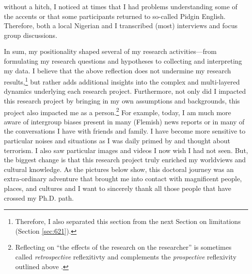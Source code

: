without a hitch, I noticed at times that I had problems understanding some of the accents or that some participants returned to so-called Pidgin English. Therefore, both a local Nigerian and I transcribed (most) interviews and focus group discussions.


In sum, my positionality shaped several of my research activities---from formulating my research questions and hypotheses to collecting and interpreting my data. I believe that the above reflection does not undermine my research results,\footnote{Therefore, I also separated this section from the next Section on limitations (Section \ref{sec:621}).} but rather adds additional insights into the complex and multi-layered dynamics underlying each research project. Furthermore, not only did I impacted this research project by bringing in my own assumptions and backgrounds, this project also impacted me as a person.\footnote{Reflecting on ``the effects of the research on the researcher'' is sometimes called \textit{retrospective} reflexitivty and complements the \textit{prospective} reflexivity outlined above \citep{Attia2017}.} For example, today, I am much more aware of intergroup biases present in many (Flemish) news reports or in many of the conversations I have with friends and family. I have become more sensitive to particular noises and situations as I was daily primed by and thought about terrorism. I also saw particular images and videos I now wish I had not seen. But, the biggest change is that this research project truly enriched my worldviews and cultural knowledge. As the pictures below show, this doctoral journey was an extra-ordinary adventure that brought me into contact with magnificent people, places, and cultures and I want to sincerely thank all those people that have crossed my Ph.D. path. 


